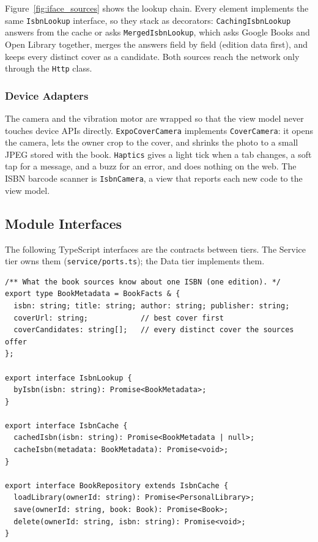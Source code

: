 \documentclass[12pt]{article}
\begin{document}
Figure~\ref{fig:iface_sources} shows the lookup chain. Every element implements the same \texttt{IsbnLookup} interface, so they stack as decorators: \texttt{CachingIsbnLookup} answers from the cache or asks \texttt{MergedIsbnLookup}, which asks Google Books and Open Library together, merges the answers field by field (edition data first), and keeps every distinct cover as a candidate. Both sources reach the network only through the \texttt{Http} class.

\subsubsection{Device Adapters}

The camera and the vibration motor are wrapped so that the view model never touches device APIs directly. \texttt{ExpoCoverCamera} implements \texttt{CoverCamera}: it opens the camera, lets the owner crop to the cover, and shrinks the photo to a small JPEG stored with the book. \texttt{Haptics} gives a light tick when a tab changes, a soft tap for a message, and a buzz for an error, and does nothing on the web. The ISBN barcode scanner is \texttt{IsbnCamera}, a view that reports each new code to the view model.

\subsection{Module Interfaces}

The following TypeScript interfaces are the contracts between tiers. The Service tier owns them (\texttt{service/ports.ts}); the Data tier implements them.

\begin{lstlisting}
/** What the book sources know about one ISBN (one edition). */
export type BookMetadata = BookFacts & {
  isbn: string; title: string; author: string; publisher: string;
  coverUrl: string;            // best cover first
  coverCandidates: string[];   // every distinct cover the sources offer
};

export interface IsbnLookup {
  byIsbn(isbn: string): Promise<BookMetadata>;
}

export interface IsbnCache {
  cachedIsbn(isbn: string): Promise<BookMetadata | null>;
  cacheIsbn(metadata: BookMetadata): Promise<void>;
}

export interface BookRepository extends IsbnCache {
  loadLibrary(ownerId: string): Promise<PersonalLibrary>;
  save(ownerId: string, book: Book): Promise<Book>;
  delete(ownerId: string, isbn: string): Promise<void>;
}
\end{lstlisting}
\end{document}
